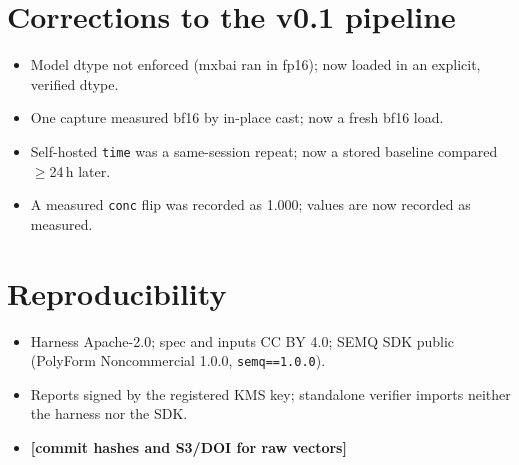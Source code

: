 \documentclass{article}
\newcommand{\todo}[1]{\textcolor{sTwo}{\textbf{[#1]}}}
\begin{document}
\section{Corrections to the v0.1 pipeline}
\begin{itemize}
  \item Model dtype not enforced (mxbai ran in fp16); now loaded in an explicit, verified dtype.
  \item One capture measured bf16 by in-place cast; now a fresh bf16 load.
  \item Self-hosted \texttt{time} was a same-session repeat; now a stored baseline compared $\ge$24\,h later.
  \item A measured \texttt{conc} flip was recorded as 1.000; values are now recorded as measured.
\end{itemize}

\section{Reproducibility}
\begin{itemize}
  \item Harness Apache-2.0; spec and inputs CC BY 4.0; SEMQ SDK public (PolyForm Noncommercial 1.0.0, \texttt{semq==1.0.0}).
  \item Reports signed by the registered KMS key; standalone verifier imports neither the harness nor the SDK.
  \item \todo{commit hashes and S3/DOI for raw vectors}
\end{itemize}
\end{document}
